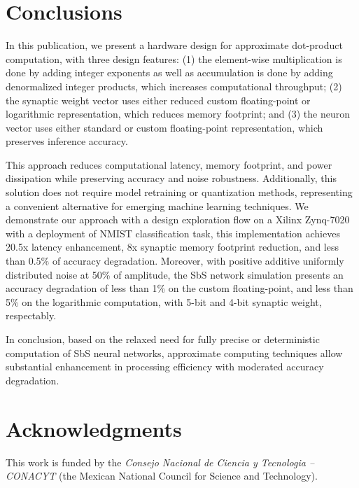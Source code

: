 \section{Conclusions}
\label{sec:conclusions}

In this publication, we present a hardware design for approximate dot-product computation, with three design features: (1) the element-wise multiplication is done by adding integer exponents as well as accumulation is done by adding denormalized integer products, which increases computational throughput; (2) the synaptic weight vector uses either reduced custom floating-point or logarithmic representation, which reduces memory footprint; and (3) the neuron vector uses either standard or custom floating-point representation, which preserves inference accuracy.

This approach reduces computational latency, memory footprint, and power dissipation while preserving accuracy and noise robustness. Additionally, this solution does not require model retraining or quantization methods, representing a convenient alternative for emerging machine learning techniques. We demonstrate our approach with a design exploration flow on a Xilinx Zynq-7020 with a deployment of NMIST classification task, this implementation achieves 20.5x latency enhancement, 8x synaptic memory footprint reduction, and less than 0.5\% of accuracy degradation. Moreover, with positive additive uniformly distributed noise at 50\% of amplitude, the SbS network simulation presents an accuracy degradation of less than 1\% on the custom floating-point, and less than 5\% on the logarithmic computation, with 5-bit and 4-bit synaptic weight, respectably.

In conclusion, based on the relaxed need for fully precise or deterministic computation of SbS neural networks, approximate computing techniques allow substantial enhancement in processing efficiency with moderated accuracy degradation.

\section * {Acknowledgments}\label{sec:Ack}
This work is funded by the \textit{Consejo Nacional de Ciencia y Tecnologia -- CONACYT} (the Mexican National Council for Science and Technology).
